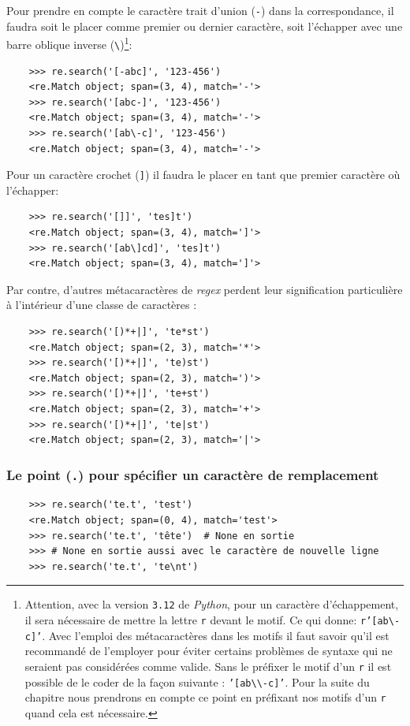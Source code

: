 \documentclass[a4paper,12pt]{book}
\begin{document}
Pour prendre en compte le caractère trait d'union (\texttt{-}) dans la correspondance, il faudra soit le placer comme premier ou dernier caractère, soit l'échapper avec une barre oblique inverse (\texttt{\textbackslash})\footnote{Attention, avec la version \texttt{3.12} de \textit{Python}, pour un caractère d'échappement, il sera nécessaire de mettre la lettre \texttt{r} devant le motif. Ce qui donne: \texttt{r'[ab\textbackslash{}-c]'}. Avec l'emploi des métacaractères dans les motifs il faut savoir qu'il est recommandé de l'employer pour éviter certains problèmes de syntaxe qui ne seraient pas considérées comme valide. Sans le préfixer le motif d'un \texttt{r} il est possible de le coder de la façon suivante : \texttt{'[ab\textbackslash{}\textbackslash{}-c]'}. Pour la suite du chapitre nous prendrons en compte ce point en préfixant nos motifs d'un \texttt{r} quand cela est nécessaire.}:
\begin{verbatim}
    >>> re.search('[-abc]', '123-456')
    <re.Match object; span=(3, 4), match='-'>
    >>> re.search('[abc-]', '123-456')
    <re.Match object; span=(3, 4), match='-'>
    >>> re.search('[ab\-c]', '123-456')
    <re.Match object; span=(3, 4), match='-'>
\end{verbatim}
\medskip

Pour un caractère crochet (\texttt{]}) il faudra le placer en tant que premier caractère où l'échapper:
\begin{verbatim}
    >>> re.search('[]]', 'tes]t')
    <re.Match object; span=(3, 4), match=']'>
    >>> re.search('[ab\]cd]', 'tes]t')
    <re.Match object; span=(3, 4), match=']'>
\end{verbatim}
\medskip

Par contre, d'autres métacaractères de \textit{regex} perdent leur signification particulière à l'intérieur d'une classe de caractères :
\begin{verbatim}
    >>> re.search('[)*+|]', 'te*st')
    <re.Match object; span=(2, 3), match='*'>
    >>> re.search('[)*+|]', 'te)st')
    <re.Match object; span=(2, 3), match=')'>
    >>> re.search('[)*+|]', 'te+st')
    <re.Match object; span=(2, 3), match='+'>
    >>> re.search('[)*+|]', 'te|st')
    <re.Match object; span=(2, 3), match='|'>
\end{verbatim}
\medskip

\subsubsection*{Le point (\texttt{.}) pour spécifier un caractère de remplacement}
\begin{verbatim}
    >>> re.search('te.t', 'test')
    <re.Match object; span=(0, 4), match='test'>
    >>> re.search('te.t', 'tête')  # None en sortie
    >>> # None en sortie aussi avec le caractère de nouvelle ligne
    >>> re.search('te.t', 'te\nt')
\end{verbatim}
\medskip
\end{document}

